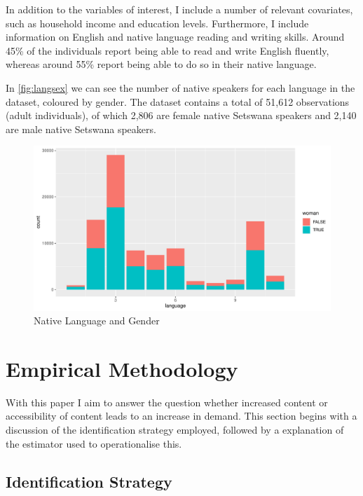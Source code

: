 \documentclass[a4paper,british]{article}\usepackage[]{graphicx}\usepackage[]{xcolor}
\makeatletter
\def\maxwidth{ %
  \ifdim\Gin@nat@width>\linewidth
    \linewidth
  \else
    \Gin@nat@width
  \fi
}
\newenvironment{knitrout}{}{} %
\let\ref\autoref
\makeatother
\begin{document}
In addition to the variables of interest, I include a number of relevant
covariates, such as household income and education levels. Furthermore,
I include information on English and native language reading and writing
skills. Around 45\% of the individuals report being able to read and
write English fluently, whereas around 55\% report being able to do
so in their native language.

In \ref{fig:langsex} we can see the number of native speakers for
each language in the dataset, coloured by gender. The dataset contains
a total of 51,612 observations (adult individuals), of which 2,806
are female native Setswana speakers and 2,140 are male native Setswana
speakers.

\begin{figure}[H]
\caption{Native Language and Gender}

\label{fig:langsex}

\begin{knitrout}
\color{fgcolor}
\includegraphics[width=\maxwidth]{../misc/latex-lang_woman-1} 
\end{knitrout}
\end{figure}


\section{Empirical Methodology}

\label{sec:methods}With this paper I aim to answer the question whether
increased content or accessibility of content leads to an increase
in demand. This section begins with a discussion of the identification
strategy employed, followed by a explanation of the estimator used
to operationalise this.

\subsection{Identification Strategy}
\end{document}
